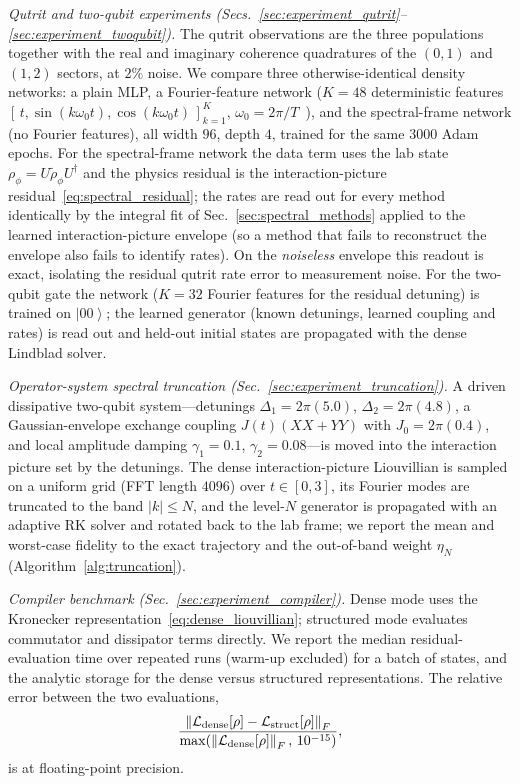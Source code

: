 \documentclass[11pt]{article}
\newcommand{\calL}{\mathcal{L}}
\newcommand{\norm}[1]{\left\lVert #1 \right\rVert}
\newcommand{\ket}[1]{\left\lvert #1 \right\rangle}
\newcommand{\rhophi}{\rho_{\phi}}
\begin{document}
\emph{Qutrit and two-qubit experiments (Secs.~\ref{sec:experiment_qutrit}--\ref{sec:experiment_twoqubit}).} The qutrit observations are the three populations together with the real and imaginary coherence quadratures of the $(0,1)$ and $(1,2)$ sectors, at $2\%$ noise. We compare three otherwise-identical density networks: a plain MLP, a Fourier-feature network ($K=48$ deterministic features $[\,t,\sin(k\omega_0t),\cos(k\omega_0t)\,]_{k=1}^{K}$, $\omega_0=2\pi/T$~\cite{tancik2020fourier}), and the spectral-frame network (no Fourier features), all width $96$, depth $4$, trained for the same $3000$ Adam epochs. For the spectral-frame network the data term uses the lab state $\rhophi=U\widetilde\rho_\phi U^\dagger$ and the physics residual is the interaction-picture residual~\eqref{eq:spectral_residual}; the rates are read out for every method identically by the integral fit of Sec.~\ref{sec:spectral_methods} applied to the learned interaction-picture envelope (so a method that fails to reconstruct the envelope also fails to identify rates). On the \emph{noiseless} envelope this readout is exact, isolating the residual qutrit rate error to measurement noise. For the two-qubit gate the network ($K=32$ Fourier features for the residual detuning) is trained on $\ket{00}$; the learned generator (known detunings, learned coupling and rates) is read out and held-out initial states are propagated with the dense Lindblad solver.

\emph{Operator-system spectral truncation (Sec.~\ref{sec:experiment_truncation}).} A driven dissipative two-qubit system---detunings $\Delta_1=2\pi(5.0)$, $\Delta_2=2\pi(4.8)$, a Gaussian-envelope exchange coupling $J(t)(XX{+}YY)$ with $J_0=2\pi(0.4)$, and local amplitude damping $\gamma_1=0.1$, $\gamma_2=0.08$---is moved into the interaction picture set by the detunings. The dense interaction-picture Liouvillian is sampled on a uniform grid (FFT length $4096$) over $t\in[0,3]$, its Fourier modes are truncated to the band $|k|\le N$, and the level-$N$ generator is propagated with an adaptive RK solver and rotated back to the lab frame; we report the mean and worst-case fidelity to the exact trajectory and the out-of-band weight $\eta_N$ (Algorithm~\ref{alg:truncation}).

\emph{Compiler benchmark (Sec.~\ref{sec:experiment_compiler}).} Dense mode uses the Kronecker representation~\eqref{eq:dense_liouvillian}; structured mode evaluates commutator and dissipator terms directly. We report the median residual-evaluation time over repeated runs (warm-up excluded) for a batch of states, and the analytic storage for the dense versus structured representations. The relative error between the two evaluations,
\begin{equation*}
    \frac{\norm{\calL_{\rm dense}[\rho]-\calL_{\rm struct}[\rho]}_F}{\max(\norm{\calL_{\rm dense}[\rho]}_F,\,10^{-15})},
\end{equation*}
is at floating-point precision.
\end{document}
